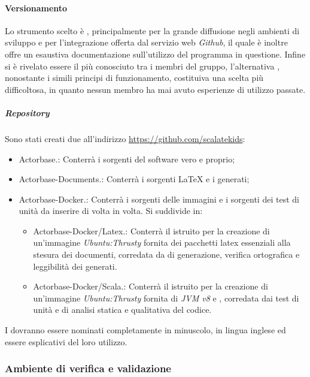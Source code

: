 \documentclass{scalatekids-article}
\begin{document}
\paragraph{Versionamento}
Lo strumento scelto è , principalmente per la grande diffusione negli
ambienti di sviluppo e per l'integrazione offerta dal servizio web
\textit{Github}, il quale è inoltre offre un esaustiva documentazione
sull'utilizzo del programma in questione. Infine  si è rivelato essere
il più conosciuto tra i membri del gruppo, l'alternativa , nonostante
i simili principi di funzionamento, costituiva una scelta più difficoltosa, in
quanto nessun membro ha mai avuto esperienze di utilizzo passate.
\subparagraph{Repository}
Sono stati creati due  all'indirizzo \url{https://github.com/scalatekids}:
\begin{itemize}
\item Actorbase.: Conterrà i sorgenti del software vero e proprio;
\item Actorbase-Documents.: Conterrà i sorgenti \LaTeX\xspace e i  generati;
\item Actorbase-Docker.: Conterrà i sorgenti delle immagini
   e i sorgenti dei test di unità da inserire di volta in volta.
  Si suddivide in:
  \begin{itemize}
    \item Actorbase-Docker/Latex.: Conterrà il 
      istruito per la creazione di un'immagine \textit{Ubuntu:Thrusty} fornita
      dei pacchetti latex essenziali alla stesura dei documenti, corredata da
       di generazione, verifica ortografica e leggibilità dei
       generati.
    \item Actorbase-Docker/Scala.: Conterrà il 
      istruito per la creazione di un'immagine \textit{Ubuntu:Thrusty} fornita
      di \textit{JVM v8} e , corredata dai test di unità e
       di analisi statica e qualitativa del codice.
  \end{itemize}
\end{itemize}
I  dovranno essere nominati completamente in minuscolo, in lingua
inglese ed essere esplicativi del loro utilizzo.
\subsubsection{Ambiente di verifica e validazione}
\end{document}
